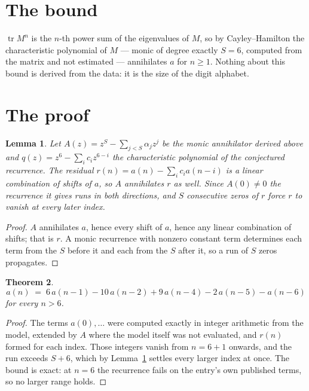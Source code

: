\documentclass[11pt,a4paper]{article}
\theoremstyle{plain}
\newtheorem{theorem}{Theorem}
\newtheorem{lemma}[theorem]{Lemma}
\theoremstyle{definition}
\begin{document}
\section{The bound}

$\operatorname{tr}M^{n}$ is the $n$-th power sum of the eigenvalues of $M$, so by
Cayley--Hamilton the characteristic polynomial of $M$ --- monic of degree exactly $S=6$,
computed from the matrix and not estimated --- annihilates $a$ for $n\ge1$. Nothing about this
bound is derived from the data: it is the size of the digit alphabet.

\section{The proof}

\begin{lemma}\label{lem:crit}
Let $A(z)=z^S-\sum_{j<S}\alpha_jz^{j}$ be the monic annihilator derived above and
$q(z)=z^{6}-\sum_ic_iz^{6-i}$ the characteristic polynomial of the conjectured
recurrence. The residual $r(n)=a(n)-\sum_ic_ia(n-i)$ is a linear combination of shifts of $a$,
so $A$ annihilates $r$ as well. Since $A(0)\ne0$ the recurrence it gives runs in both
directions, and $S$ consecutive zeros of $r$ force $r$ to vanish at every later index.
\end{lemma}

\begin{proof}
$A$ annihilates $a$, hence every shift of $a$, hence any linear combination of shifts; that is
$r$. A monic recurrence with nonzero constant term determines each term from the $S$ before it
and each from the $S$ after it, so a run of $S$ zeros propagates.
\end{proof}

\begin{theorem}
\[
a(n)\;=\;6\,a(n-1) - 10\,a(n-2) + 9\,a(n-4) - 2\,a(n-5) - a(n-6)
\]
for every $n>6$.
\end{theorem}

\begin{proof}
The terms $a(0),\dots$ were computed exactly in integer arithmetic from the model, extended by
$A$ where the model itself was not evaluated, and $r(n)$ formed for each index. Those integers
vanish from $n=6+1$ onwards, and the run exceeds $S+6$, which by
Lemma~\ref{lem:crit} settles every larger index at once. The bound is exact: at $n=6$ the recurrence fails on the entry's own published terms, so no larger range holds.
\end{proof}
\end{document}
